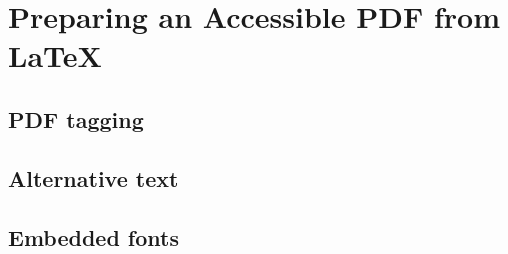 \chapter{Preparing an Accessible PDF from LaTeX}\label{sec:PDFPrep}


\section{PDF tagging}\label{sec:PDFPrep_Tagging}


\section{Alternative text}\label{sec:PDFPrep_AltText}


\section{Embedded fonts}\label{sec:PDFPrep_EmbeddedFonts}
